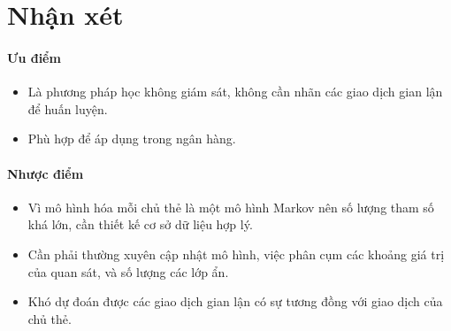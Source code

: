 \chapter*{Nhận xét}
\subsubsection{Ưu điểm}
\begin{itemize}
	\item Là phương pháp học không giám sát, không cần nhãn các giao dịch gian lận để huấn luyện.
	\item Phù hợp để áp dụng trong ngân hàng.
\end{itemize}
\subsubsection{Nhược điểm}
\begin{itemize}
	\item Vì mô hình hóa mỗi chủ thẻ là một mô hình Markov nên số lượng tham số khá lớn, cần thiết kế cơ sở dữ liệu hợp lý.
	\item Cần phải thường xuyên cập nhật  mô hình,  việc phân cụm các khoảng giá trị của quan sát, và số lượng các lớp ẩn.
	\item Khó dự đoán được các giao dịch gian lận có sự tương đồng với giao dịch của chủ thẻ.
\end{itemize}


